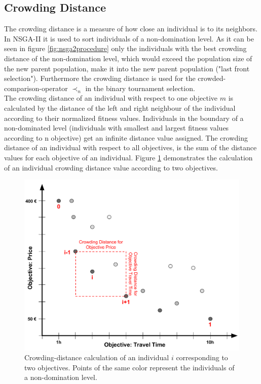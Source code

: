    \subsection{Crowding Distance}
    \label{sec:crowdingDistance}
    The crowding distance is a measure of how close an individual is to its neighbors. In NSGA-II it is used to sort individuals of a non-domination level. As it can be seen in figure \ref{fig:nsga2procedure} only the individuals with the best crowding distance of the non-domination level, which would exceed the population size of the new parent population, make it into the new parent population ("last front selection"\cite{Fortin:2013}). Furthermore the crowding distance is used for the crowded-comparison-operator $\prec_n$ in the binary tournament selection.\\
    The crowding distance of an individual with respect to one objective $m$ is calculated by the distance of the left and right neighbour of the individual according to their normalized fitness values. Individuals in the boundary of a non-dominated level (individuals with smallest and largest fitness values according to n objective) get an infinite distance value assigned. The crowding distance of an individual with respect to all objectives, is the sum of the distance values for each objective of an individual. Figure \ref{fig:crowdingDistance} demonstrates the calculation of an individual crowding distance value according to two objectives.\\
    \begin{figure}
        \centering
        \includegraphics[scale=0.3]{./Figures/CrowdingDistance}
        \caption{Crowding-distance calculation of an individual $i$ corresponding to two objectives. Points of the same color represent the individuals of a non-domination level.}
        \label{fig:crowdingDistance}
    \end{figure}
